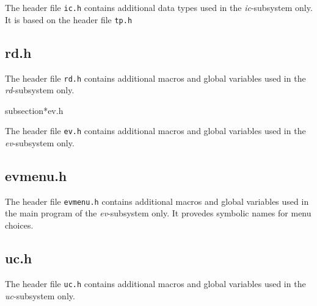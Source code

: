 The header file {\tt ic.h} contains additional data types used in the
{\it ic}-subsystem only.
It is based on the header file {\tt tp.h}


\subsection*{rd.h}

The header file {\tt rd.h} contains additional macros and global variables
used in the {\it rd}-subsystem only.


subsection*{ev.h}

The header file {\tt ev.h} contains additional macros and global variables
used in the {\it ev}-subsystem only.


\subsection*{evmenu.h}

The header file {\tt evmenu.h} contains additional macros and global variables
used in the main program of the {\it ev}-subsystem only.
It provedes symbolic names for menu choices.


\subsection*{uc.h}

The header file {\tt uc.h} contains additional macros and global variables
used in the {\it uc}-subsystem only.





